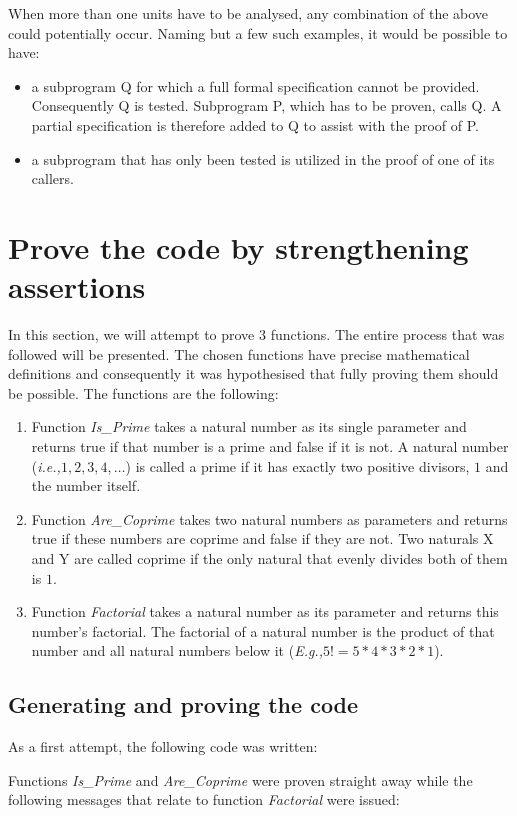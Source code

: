 \documentclass{llncs}
\newcommand{\ie}{\textit{i.e.,}\xspace}
\newcommand{\Eg}{\textit{E.g.,}\xspace}
\begin{document}
When more than one units have to be analysed, any combination of the above could
potentially occur. Naming but a few such examples, it would be possible to have:
\begin{itemize}
  \item a subprogram Q for which a full formal specification cannot be provided.
    Consequently Q is tested. Subprogram P, which has to be proven, calls Q.
    A partial specification is therefore added to Q to assist with the proof of P.

  \item a subprogram that has only been tested is utilized in the proof of one of its
    callers.
\end{itemize}



\section{Prove the code by strengthening assertions}
In this section, we will attempt to prove 3 functions. The entire process that
was followed will be presented. The chosen functions have precise mathematical
definitions and consequently it was hypothesised that fully proving them should
be possible. The functions are the following:
\begin{enumerate}
  \item Function \emph{Is\_Prime} takes a natural number as its single parameter
    and returns true if that number is a prime and false if it is not. A natural
    number (\ie $1, 2, 3, 4, \dots$) is called a prime if it has exactly two
    positive divisors, $1$ and the number itself.

  \item Function \emph{Are\_Coprime} takes two natural numbers as parameters and returns
    true if these numbers are coprime and false if they are not. Two naturals X and Y
    are called coprime if the only natural that evenly divides both of them is $1$.

  \item Function \emph{Factorial} takes a natural number as its parameter and returns
    this number's factorial. The factorial of a natural number is the product of that
    number and all natural numbers below it (\Eg $5! = 5 * 4 * 3 * 2 * 1$).
\end{enumerate}

\subsection{Generating and proving the code}
As a first attempt, the following code was written:


Functions \emph{Is\_Prime} and \emph{Are\_Coprime} were proven straight away while the following
messages that relate to function \emph{Factorial} were issued:
\end{document}
